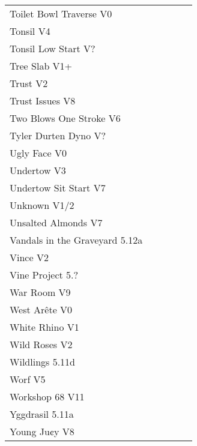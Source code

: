 \begin{flushleft}
\begin{center}
\begin{supertabular}{p{0.76\linewidth}p{0.08\linewidth}}
Toilet Bowl Traverse V0 & \pageref{rt:Toilet Bowl Traverse} \\
Tonsil V4 & \pageref{rt:Tonsil} \\
Tonsil Low Start V? & \pageref{vr:Tonsil Low Start} \\
Tree Slab V1+ & \pageref{rt:Tree Slab} \\
Trust V2 & \pageref{rt:Trust} \\
Trust Issues V8 & \pageref{rt:Trust Issues} \\
Two Blows One Stroke V6 & \pageref{rt:Two Blows One Stroke} \\
Tyler Durten Dyno V? & \pageref{vr:Tyler Durten Dyno} \\
Ugly Face V0 & \pageref{rt:Ugly Face} \\
Undertow V3 & \pageref{rt:Undertow} \\
Undertow Sit Start V7 & \pageref{vr:Undertow Sit Start} \\
Unknown V1/2 & \pageref{rt:Unknown on E's Dirty B} \\
Unsalted Almonds V7 & \pageref{rt:Unsalted Almonds} \\
Vandals in the Graveyard 5.12a & \pageref{rt:Vandals in the Graveyard} \\
Vince V2 & \pageref{rt:Vince} \\
Vine Project 5.? & \pageref{rt:Vine Project} \\
War Room V9 & \pageref{rt:War Room} \\
West Arête V0 & \pageref{rt:West Arête} \\
White Rhino V1 & \pageref{rt:White Rhino} \\
Wild Roses V2 & \pageref{rt:Wild Roses} \\
Wildlings 5.11d & \pageref{rt:Wildlings} \\
Worf V5 & \pageref{rt:Worf} \\
Workshop 68 V11 & \pageref{vr:Workshop 68} \\
Yggdrasil 5.11a & \pageref{rt:Yggdrasil} \\
Young Ju¢y V8 & \pageref{rt:Young Ju¢y} \\
\end{supertabular}
\end{center}
\needspace{1.5cm}

\end{flushleft}
